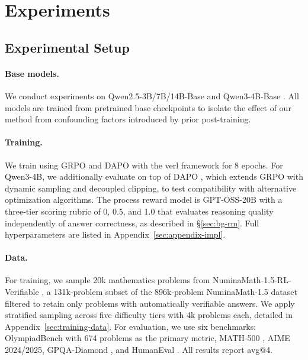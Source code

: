 \section{Experiments}
\label{sec:experiments}

\subsection{Experimental Setup}
\label{sec:setup}

\paragraph{Base models.} We conduct experiments on Qwen2.5-3B/7B/14B-Base \citep{yang2024qwen2} and Qwen3-4B-Base \citep{yang2025qwen3technicalreport}. All models are trained from pretrained base checkpoints to isolate the effect of our method from confounding factors introduced by prior post-training.

\paragraph{Training.} We train using GRPO and DAPO with the verl framework \citep{sheng2024hybridflow} for 8 epochs. For Qwen3-4B, we additionally evaluate \method{} on top of DAPO \citep{Yu2025a}, which extends GRPO with dynamic sampling and decoupled clipping, to test compatibility with alternative optimization algorithms. The process reward model is GPT-OSS-20B with a three-tier scoring rubric of 0, 0.5, and 1.0 that evaluates reasoning quality independently of answer correctness, as described in \S\ref{sec:bg-rm}. Full hyperparameters are listed in Appendix~\ref{sec:appendix-impl}.

\paragraph{Data.} For training, we sample 20k mathematics problems from NuminaMath-1.5-RL-Verifiable \citep{numina_math_datasets,nlile2025numinamath15rlverifiable}, a 131k-problem subset of the 896k-problem NuminaMath-1.5 dataset filtered to retain only problems with automatically verifiable answers. We apply stratified sampling across five difficulty tiers with 4k problems each, detailed in Appendix~\ref{sec:training-data}. For evaluation, we use six benchmarks: OlympiadBench \citep{he2024olympiadbench} with 674 problems as the primary metric, MATH-500 \citep{lightman2023lets}, AIME 2024/2025\citep{balunovic_srimatharena_2025}, GPQA-Diamond \citep{rein2024gpqa}, and HumanEval \citep{chen2021evaluating}. All results report avg@4.

